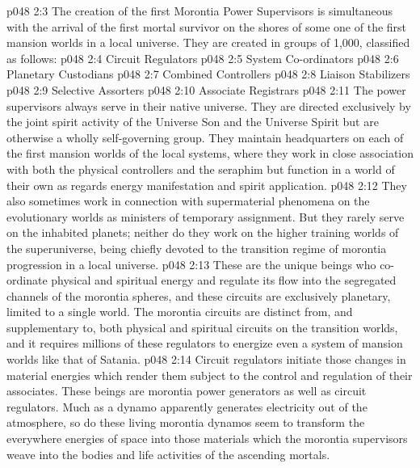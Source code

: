 \vs p048 2:3 The creation of the first Morontia Power Supervisors is simultaneous with the arrival of the first mortal survivor on the shores of some one of the first mansion worlds in a local universe. They are created in groups of 1,000, classified as follows:
\vs p048 2:4 \bibnobreakspace Circuit Regulators
\vs p048 2:5 \bibnobreakspace System Co\hyp{}ordinators
\vs p048 2:6 \bibnobreakspace Planetary Custodians
\vs p048 2:7 \bibnobreakspace Combined Controllers
\vs p048 2:8 \bibnobreakspace Liaison Stabilizers
\vs p048 2:9 \bibnobreakspace Selective Assorters
\vs p048 2:10 \bibnobreakspace Associate Registrars
\vs p048 2:11 \pc The power supervisors always serve in their native universe. They are directed exclusively by the joint spirit activity of the Universe Son and the Universe Spirit but are otherwise a wholly self\hyp{}governing group. They maintain headquarters on each of the first mansion worlds of the local systems, where they work in close association with both the physical controllers and the seraphim but function in a world of their own as regards energy manifestation and spirit application.
\vs p048 2:12 They also sometimes work in connection with supermaterial phenomena on the evolutionary worlds as ministers of temporary assignment. But they rarely serve on the inhabited planets; neither do they work on the higher training worlds of the superuniverse, being chiefly devoted to the transition regime of morontia progression in a local universe.
\vs p048 2:13 \bibnobreakspace {} These are the unique beings who co\hyp{}ordinate physical and spiritual energy and regulate its flow into the segregated channels of the morontia spheres, and these circuits are exclusively planetary, limited to a single world. The morontia circuits are distinct from, and supplementary to, both physical and spiritual circuits on the transition worlds, and it requires millions of these regulators to energize even a system of mansion worlds like that of Satania.
\vs p048 2:14 Circuit regulators initiate those changes in material energies which render them subject to the control and regulation of their associates. These beings are morontia power generators as well as circuit regulators. Much as a dynamo apparently generates electricity out of the atmosphere, so do these living morontia dynamos seem to transform the everywhere energies of space into those materials which the morontia supervisors weave into the bodies and life activities of the ascending mortals.
